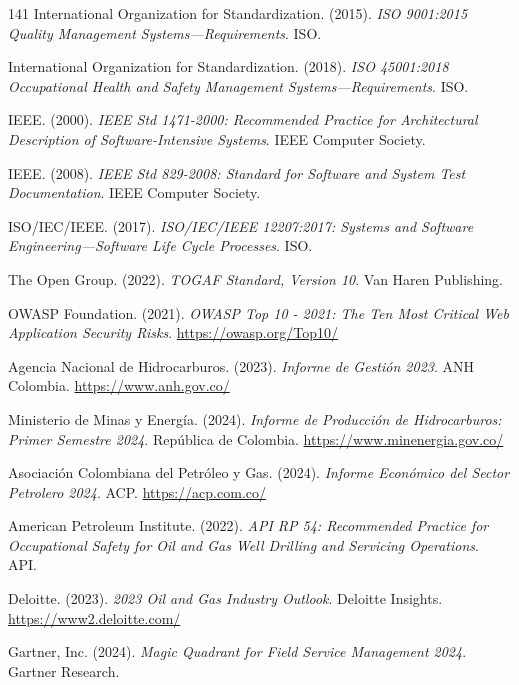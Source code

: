 \begin{thebibliography}{141}
International Organization for Standardization. (2015). \textit{ISO 9001:2015 Quality Management Systems—Requirements}. ISO.

International Organization for Standardization. (2018). \textit{ISO 45001:2018 Occupational Health and Safety Management Systems—Requirements}. ISO.

IEEE. (2000). \textit{IEEE Std 1471-2000: Recommended Practice for Architectural Description of Software-Intensive Systems}. IEEE Computer Society.

IEEE. (2008). \textit{IEEE Std 829-2008: Standard for Software and System Test Documentation}. IEEE Computer Society.

ISO/IEC/IEEE. (2017). \textit{ISO/IEC/IEEE 12207:2017: Systems and Software Engineering—Software Life Cycle Processes}. ISO.

The Open Group. (2022). \textit{TOGAF Standard, Version 10}. Van Haren Publishing.

OWASP Foundation. (2021). \textit{OWASP Top 10 - 2021: The Ten Most Critical Web Application Security Risks}. \url{https://owasp.org/Top10/}


Agencia Nacional de Hidrocarburos. (2023). \textit{Informe de Gestión 2023}. ANH Colombia. \url{https://www.anh.gov.co/}

Ministerio de Minas y Energía. (2024). \textit{Informe de Producción de Hidrocarburos: Primer Semestre 2024}. República de Colombia. \url{https://www.minenergia.gov.co/}

Asociación Colombiana del Petróleo y Gas. (2024). \textit{Informe Económico del Sector Petrolero 2024}. ACP. \url{https://acp.com.co/}

American Petroleum Institute. (2022). \textit{API RP 54: Recommended Practice for Occupational Safety for Oil and Gas Well Drilling and Servicing Operations}. API.

Deloitte. (2023). \textit{2023 Oil and Gas Industry Outlook}. Deloitte Insights. \url{https://www2.deloitte.com/}


Gartner, Inc. (2024). \textit{Magic Quadrant for Field Service Management 2024}. Gartner Research.


\end{thebibliography}
